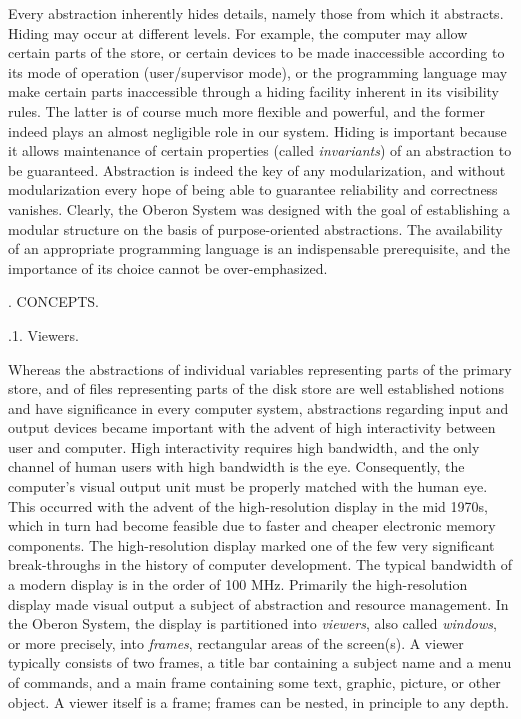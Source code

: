 Every abstraction inherently hides details, namely those from which it
abstracts. Hiding may occur at different levels. For example, the
computer may allow certain parts of the store, or certain devices to
be made inaccessible according to its mode of operation
(user/supervisor mode), or the programming language may make certain
parts inaccessible through a hiding facility inherent in its
visibility rules. The latter is of course much more flexible and
powerful, and the former indeed plays an almost negligible role in our
system. Hiding is important because it allows maintenance of certain
properties (called \emph{invariants}) of an abstraction to be
guaranteed. Abstraction is indeed the key of any modularization, and
without modularization every hope of being able to guarantee
reliability and correctness vanishes. Clearly, the Oberon System was
designed with the goal of establishing a modular structure on the
basis of purpose-oriented abstractions. The availability of an
appropriate programming language is an indispensable prerequisite, and
the importance of its choice cannot be over-emphasized.

. CONCEPTS.

.1. Viewers.

Whereas the abstractions of individual variables representing parts of
the primary store, and of files representing parts of the disk store
are well established notions and have significance in every computer
system, abstractions regarding input and output devices became
important with the advent of high interactivity between user and
computer. High interactivity requires high bandwidth, and the only
channel of human users with high bandwidth is the eye. Consequently,
the computer's visual output unit must be properly matched with the
human eye. This occurred with the advent of the high-resolution
display in the mid 1970s, which in turn had become feasible due to
faster and cheaper electronic memory components. The high-resolution
display marked one of the few very significant break-throughs in the
history of computer development. The typical bandwidth of a modern
display is in the order of 100 MHz. Primarily the high-resolution
display made visual output a subject of abstraction and resource management.
In the Oberon System, the display is partitioned into
\emph{viewers}, also called \emph{windows}, or more precisely, into \emph{frames},
rectangular areas of the screen(s). A viewer typically consists of two
frames, a title bar containing a subject name and a menu of commands,
and a main frame containing some text, graphic, picture, or other
object. A viewer itself is a frame; frames can be nested, in principle
to any depth.

